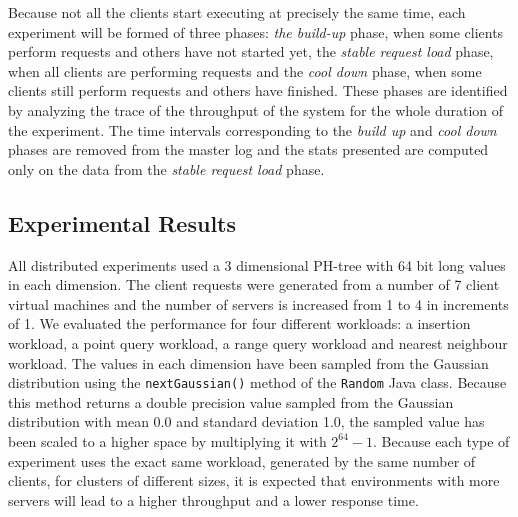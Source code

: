 \documentclass[11pt,a4paper]{globis-book}
\begin{document}
Because not all the clients start executing at precisely the same time, each experiment will be formed of three phases: \textit{the build-up} phase, when some clients perform requests and others have not started yet, the \textit{stable request load} phase, when all clients are performing requests and the \textit{cool down} phase, when some clients still perform requests and others have finished. These phases are identified by analyzing the trace of the throughput of the system for the whole duration of the experiment. The time intervals corresponding to the \textit{build up} and \textit{cool down} phases are removed from the master log and the stats presented are computed only on the data from the \textit{stable request load} phase. 

\subsection{Experimental Results}

All distributed experiments used a 3 dimensional PH-tree with 64 bit long values in each dimension. The client requests were generated from a number of 7 client virtual machines and the number of servers is increased from 1 to 4 in increments of 1. We evaluated the performance for four different workloads: a insertion workload, a point query workload, a range query workload and nearest neighbour workload. The values in each dimension have been sampled from the Gaussian distribution using the \texttt{nextGaussian()} method of the \texttt{Random} Java class. Because this method returns a double precision value sampled from the Gaussian distribution with mean 0.0 and standard deviation 1.0, the sampled value has been scaled to a higher space by multiplying it with $2^{64} - 1$. Because each type of experiment uses the exact same workload, generated by the same number of clients, for clusters of different sizes, it is expected that environments with more servers will lead to a higher throughput and a lower response time.
 
\end{document}
